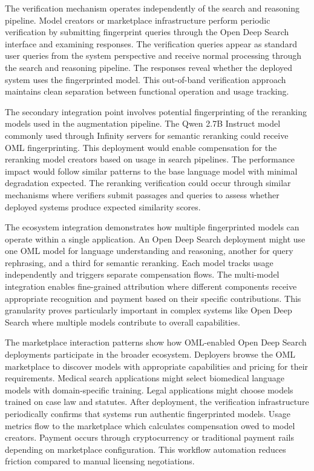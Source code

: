 The verification mechanism operates independently of the search and reasoning pipeline. Model creators or marketplace infrastructure perform periodic verification by submitting fingerprint queries through the Open Deep Search interface and examining responses. The verification queries appear as standard user queries from the system perspective and receive normal processing through the search and reasoning pipeline. The responses reveal whether the deployed system uses the fingerprinted model. This out-of-band verification approach maintains clean separation between functional operation and usage tracking.

The secondary integration point involves potential fingerprinting of the reranking models used in the augmentation pipeline. The Qwen 2.7B Instruct model commonly used through Infinity servers for semantic reranking could receive OML fingerprinting. This deployment would enable compensation for the reranking model creators based on usage in search pipelines. The performance impact would follow similar patterns to the base language model with minimal degradation expected. The reranking verification could occur through similar mechanisms where verifiers submit passages and queries to assess whether deployed systems produce expected similarity scores.

The ecosystem integration demonstrates how multiple fingerprinted models can operate within a single application. An Open Deep Search deployment might use one OML model for language understanding and reasoning, another for query rephrasing, and a third for semantic reranking. Each model tracks usage independently and triggers separate compensation flows. The multi-model integration enables fine-grained attribution where different components receive appropriate recognition and payment based on their specific contributions. This granularity proves particularly important in complex systems like Open Deep Search where multiple models contribute to overall capabilities.

The marketplace interaction patterns show how OML-enabled Open Deep Search deployments participate in the broader ecosystem. Deployers browse the OML marketplace to discover models with appropriate capabilities and pricing for their requirements. Medical search applications might select biomedical language models with domain-specific training. Legal applications might choose models trained on case law and statutes. After deployment, the verification infrastructure periodically confirms that systems run authentic fingerprinted models. Usage metrics flow to the marketplace which calculates compensation owed to model creators. Payment occurs through cryptocurrency or traditional payment rails depending on marketplace configuration. This workflow automation reduces friction compared to manual licensing negotiations.

